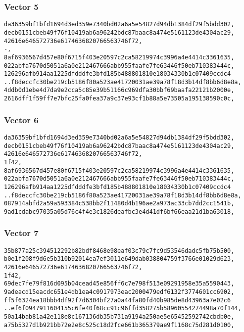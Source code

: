 \documentclass[
]{article}
\begin{document}
\hypertarget{vector-5}{%
\subsubsection{Vector 5}\label{vector-5}}

\begin{verbatim}
da36359bf1bfd1694d3ed359e7340bd02a6a5e54827d94db1384df29f5bdd302,
decb0151cbeb49f76f10419ab6a96242bdc87baac8a474e5161123de4304ac29,
42616e646572736e6174636820766563746f72,
-,
8af6936567d457e80f6715f403e20597c2ca58219974c3996a4e4414c3361635,
022abfa7670d5051a6a0e212467666abb955faafe7fe63446f50eb710383444c,
126296afb914aa1225dfdddfe3bfd185b488801810e18034330b1c07409ccdc4
..f8deccfc30be219cb5186f80a523ae41720031ae39a78f18d3b14df8bb6d8e8a,
4ddb0d1ebe4d7da9e2cca5c85e39b51166c969dfa30bbf69baafa22121b2000e,
2616dff1f59ff7e7bfc25fa0fea37a9c37e93cf1b88a5e73505a195138590c0c,
\end{verbatim}

\hypertarget{vector-6}{%
\subsubsection{Vector 6}\label{vector-6}}

\begin{verbatim}
da36359bf1bfd1694d3ed359e7340bd02a6a5e54827d94db1384df29f5bdd302,
decb0151cbeb49f76f10419ab6a96242bdc87baac8a474e5161123de4304ac29,
42616e646572736e6174636820766563746f72,
1f42,
8af6936567d457e80f6715f403e20597c2ca58219974c3996a4e4414c3361635,
022abfa7670d5051a6a0e212467666abb955faafe7fe63446f50eb710383444c,
126296afb914aa1225dfdddfe3bfd185b488801810e18034330b1c07409ccdc4
..f8deccfc30be219cb5186f80a523ae41720031ae39a78f18d3b14df8bb6d8e8a,
087914abfd2a59a593384c538bb2f11480d4b196ae2a973ac33cb7dd2cc1541b,
9ad1cdabc97035a05d76c4f4e3c1826deafbc3e4d41df6bf66eaa21d1ba63018,
\end{verbatim}

\hypertarget{vector-7}{%
\subsubsection{Vector 7}\label{vector-7}}

\begin{verbatim}
35b877a25c394512292b82bdf8468e98eaf03c79c7fc9d53546dadc5fb75b500,
b0e1f208f9d6e5b310b92014ea7ef3011e649dab038804759f3766e01029d623,
42616e646572736e6174636820766563746f72,
1f42,
69dec7fe79f816d095b04cead45e856ff6c7e798f513e09291958e35a5590443,
9adeacd15eacdc651e4db1ea4c0917973eac2000479edf6132f3774601cc6902,
ff5f6324ea18bbb4df92f7d6304bf27a0a44fa80fd40b985de8d43963a7e02c6
..ef6f0947911604155c6fe40f68cc91c96ffd358275b58960554274498a70f144,
50a14bab81a42e118e8c167136db35b731a9194a250ae5e65452592742cbdb0e,
a75b5327d1b921bb72e2e8c525c18d2fce661b365379ae9f1168c75d281d0100,
\end{verbatim}
\end{document}
